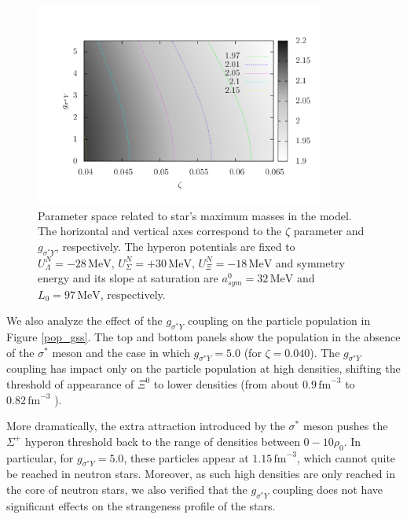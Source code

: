 \documentclass[twocolumn,showpacs,aps]{revtex4}
\begin{document}
 \begin{figure}
 \centering
 \vspace{1.0cm}
 \includegraphics[width=9.5cm]{map_gss.png}
 \caption{\label{space_gss_lambda} Parameter space related to star's maximum masses in the model. The horizontal and vertical axes
correspond to the $\zeta$ parameter and $g_{\sigma^* Y}$, respectively. 
The hyperon potentials are fixed to $U_{\Lambda}^N=-28 \,\mathrm{MeV}$, $U_{\Sigma}^N=+30 \,\mathrm{MeV}$, $U_{\Xi}^N=-18 \,\mathrm{MeV}$ 
 and symmetry energy and its slope at saturation are $a_{sym}^0= 32 \,\mathrm{MeV}$ and $L_0=97\,\mathrm{MeV}$, respectively.}
 \end{figure}
  
  
We also analyze the effect of the $g_{\sigma^* Y}$ coupling on the particle population in 
Figure \ref{pop_gss}. The top and bottom panels show the population in 
the absence of the $\sigma^*$ meson and the case in which $g_{\sigma^* Y}=5.0$ (for $\zeta=0.040$).
The $g_{\sigma^* Y}$ coupling has impact only on the particle population at high densities, 
shifting the threshold of appearance of $\Xi^0$ to lower densities (from about $0.9\,\mathrm{fm}^{-3}$
  to $0.82\,\mathrm{fm}^{-3}$
 ).

More dramatically, the extra attraction introduced by the $\sigma^*$ meson pushes the $\Sigma^+$ hyperon threshold 
back to the range of densities between $0-10\rho_0$. In particular, for $g_{\sigma^* Y}=5.0$, these
particles appear at $1.15\,\mathrm{fm}^{-3}$, which cannot quite be reached in neutron stars.
Moreover, as such high densities are only reached in the core of neutron stars, we also verified
that the $g_{\sigma^* Y}$ coupling does not have significant effects on the strangeness profile of the stars.
\end{document}
